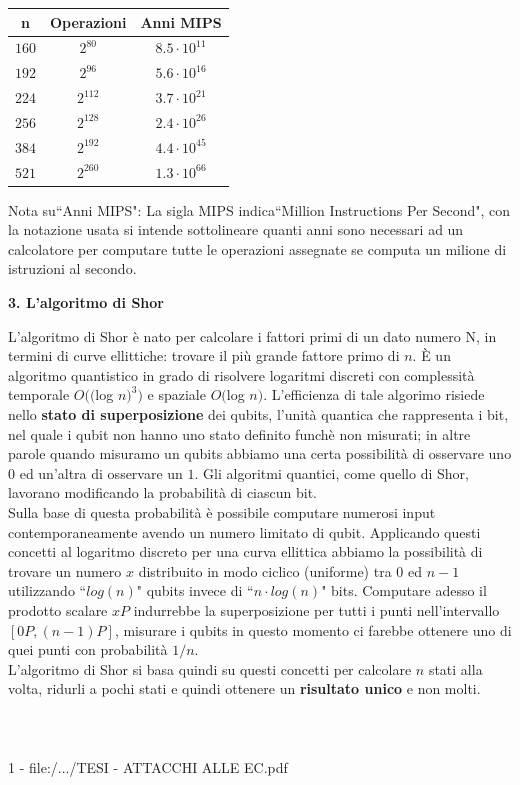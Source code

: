 \documentclass[a4paper,12pt]{tesiinfo}
\begin{document}
\begin{center}
\begin{tabular}{ c c c }
    n & Operazioni & Anni MIPS\\
    \hline
    $160$ &$2^{80}$ &$8.5 \cdot 10^{11}$\\
    $192$ &$2^{96}$ &$5.6 \cdot 10^{16}$\\
    $224$ &$2^{112}$ &$3.7 \cdot 10^{21}$\\
    $256$ &$2^{128}$ &$2.4 \cdot 10^{26}$\\
    $384$ &$2^{192}$ &$4.4 \cdot 10^{45}$\\
    $521$ &$2^{260}$ &$1.3 \cdot 10^{66}$\\
\end{tabular}
\end{center}
Nota su``Anni MIPS": La sigla MIPS indica``Million Instructions Per Second", con la notazione usata si intende sottolineare quanti anni sono necessari ad un calcolatore per computare tutte le operazioni assegnate se computa un milione di istruzioni al secondo.
\begin{center}
    \textbf{3. L'algoritmo di Shor}
\end{center}
L'algoritmo di Shor \`e nato per calcolare i fattori primi di un dato numero N, in termini di curve ellittiche: trovare il pi\`u grande fattore primo di $n$. \`E un algoritmo quantistico in grado di risolvere logaritmi discreti con complessit\`a temporale $O(($log $n)^3)$ e spaziale $O($log $n)$. L'efficienza di tale algorimo risiede nello \textbf{stato di superposizione} dei qubits, l'unit\`a quantica che rappresenta i bit, nel quale i qubit non hanno uno stato definito funch\`e non misurati; in altre parole quando misuramo un qubits abbiamo una certa possibilit\`a di osservare uno $0$ ed un'altra di osservare un $1$. Gli algoritmi quantici, come quello di Shor, lavorano modificando la probabilit\`a di ciascun bit.
\\
Sulla base di questa probabilit\`a \`e possibile computare numerosi input contemporaneamente avendo un numero limitato di qubit. Applicando questi concetti al logaritmo discreto per una curva ellittica abbiamo la possibilit\`a di trovare un numero $x$ distribuito in modo ciclico (uniforme) tra $0$ ed $n-1$ utilizzando ``$log(n)$" qubits invece di ``$n \cdot log(n)$" bits. Computare adesso il prodotto scalare $xP$ indurrebbe la superposizione per tutti i punti nell'intervallo $[0P, (n-1)P]$, misurare i qubits in questo momento ci farebbe ottenere uno di quei punti con probabilit\`a $1 \big / n$.
\\
L'algoritmo di Shor si basa quindi su questi concetti per calcolare $n$ stati alla volta, ridurli a pochi stati e quindi ottenere un \textbf{risultato unico} e non molti.
%
%
\\
\\
\\
\\1 - file:/.../TESI - ATTACCHI ALLE EC.pdf
%
%
%
%
%
%
%
%
\end{document}
